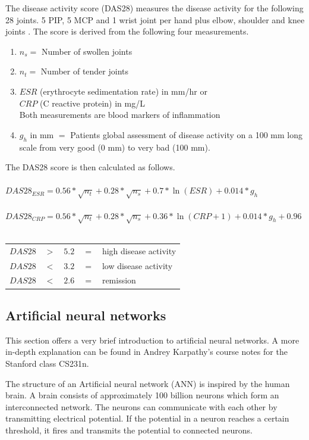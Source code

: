 \documentclass[12pt]{article}
\begin{document}
The disease activity score (DAS28) measures the disease activity for the following 28 joints. 5 PIP, 5 MCP and 1 wrist joint per hand plus elbow, shoulder and knee joints \cite{runmc}. The score is derived from the following four measurements.

\begin{enumerate}[label=(\alph*)]
\item $n_s =$ Number of swollen joints
\item $n_t =$ Number of tender joints
\item $ESR$ (erythrocyte sedimentation rate) in mm/hr or \\ $CRP$ (C reactive protein) in mg/L\\ Both measurements are blood markers of inflammation
\item $g_h$ in mm $=$ Patients global assessment of disease activity on a 100 mm long scale from very good (0 mm) to very bad (100 mm).
\end{enumerate}

The DAS28 score is then calculated as follows. \cite{runmc_formula}
\\
\\
$DAS28_{ESR} = 0.56 * \sqrt{n_t} + 0.28 * \sqrt{n_s} + 0.7 * \ln{(ESR)} + 0.014 * g_h$
\\
\\
$DAS28_{CRP} = 0.56 * \sqrt{n_t} + 0.28 * \sqrt{n_s} + 0.36 * \ln{(CRP + 1)} + 0.014 * g_h + 0.96$
\\
\\
\begin{tabular}{@{}lllll}
$DAS28$ & $>$ & $5.2$ & $=$ & high disease activity \\
$DAS28$ & $<$ & $3.2$ & $=$ & low disease activity \\
$DAS28$ & $<$ & $2.6$ & $=$ & remission
\end{tabular}

\subsection{Artificial neural networks}
\label{subsec:ann}
This section offers a very brief introduction to artificial neural networks. A more in-depth explanation can be found in Andrey Karpathy's course notes for the Stanford class CS231n. \cite{karpathy}

The structure of an Artificial neural network (ANN) is inspired by the human brain. A brain consists of approximately 100 billion neurons which form an interconnected network. The neurons can communicate with each other by transmitting electrical potential. If the potential in a neuron reaches a certain threshold, it fires and transmits the potential to connected neurons. \cite{kruse_2016}
\end{document}

